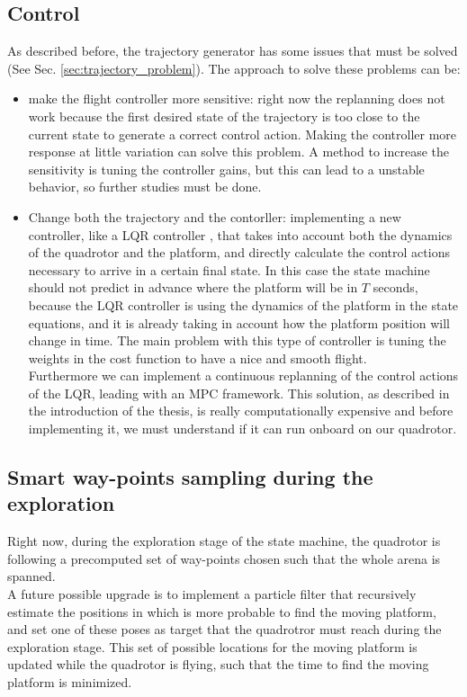 \subsection{Control}
As described before, the trajectory generator has some issues that must be solved  (See Sec. \ref{sec:trajectory_problem}). The approach to solve these problems can be:
\begin{itemize}
\item make the flight controller more sensitive: right now the replanning does not work because the first desired state of the trajectory is too close to the current state to generate a correct control action. Making the controller more response at little variation can solve this problem. A method to increase the sensitivity is tuning the controller gains, but this can lead to a unstable behavior, so further studies must be done.
\item Change both the trajectory and the contorller: implementing a new controller, like a LQR controller \cite{wiki_lqr}, that takes into account both the dynamics of the quadrotor and the platform, and directly calculate the control actions necessary to arrive in a certain final state. In this case the state machine should not predict in advance where the platform will be in $T$ seconds, because the LQR controller is using the dynamics of the platform in the state equations, and it is already taking in account how the platform position will change in time. The main problem with this type of controller is tuning the weights in the cost function to have a nice and smooth flight. \\ 
Furthermore we can implement a continuous replanning of the control actions of the LQR, leading with an MPC framework. This solution, as described in the introduction of the thesis, is really computationally expensive and before implementing it, we must understand if it can run onboard on our quadrotor.
\end{itemize} 

\subsection{Smart way-points sampling during the exploration}
Right now, during the exploration stage of the state machine, the quadrotor is following a precomputed set of way-points chosen such that the whole arena is spanned.\\
A future possible upgrade is to implement a particle filter \cite{particlefilter} that recursively estimate the positions in which is more probable to find the moving platform, and set one of these poses as target that the quadrotror must reach during the exploration stage. 
This set of possible locations for the moving platform is updated while the quadrotor is flying, such that the time to find the moving platform is minimized.\\

